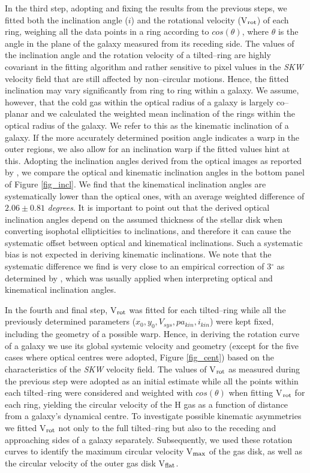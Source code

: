 \documentclass[usenatbib,useAMS]{mnras}
\begin{document}
In the third step, adopting and fixing the results from the previous
steps, we fitted both the inclination angle ($i$) and the rotational
velocity (V$_{\rm rot}$) of each ring, weighing all the data points in a
ring according to $cos(\theta)$, where $\theta$ is the angle in the
plane of the galaxy measured from its receding side.  The values of the
inclination angle and the rotation velocity of a tilted--ring are highly
covariant in the fitting algorithm and rather sensitive to pixel values
in the {\it SKW} velocity field that are still affected by non--circular
motions.  Hence, the fitted inclination may vary significantly from ring
to ring within a galaxy.  We assume, however, that the cold gas within
the optical radius of a galaxy is largely co--planar and we calculated
the weighted mean inclination of the rings within the optical radius of
the galaxy. We refer to this as the kinematic inclination of a
galaxy. If the more accurately determined position angle indicates a
warp in the outer regions, we also allow for an inclination warp if the
fitted values hint at this. Adopting the inclination angles derived from the optical
images as reported by , we compare the optical and
kinematic inclination angles in the bottom panel of Figure \ref{fig_incl}. 
We find that the kinematical inclination angles are
systematically lower than the optical ones, with an average weighted
difference of $2.06\pm0.81$ {\it degrees}.  It is important to point out
that the derived optical inclination angles depend on the assumed
thickness of the stellar disk when converting isophotal ellipticities to
inclinations, and therefore it can cause the systematic offset between
optical and kinematical inclinations.  Such a systematic bias is not
expected in deriving kinematic inclinations. We note that the
systematic difference we find is very close to an empirical correction
of 3$^{\circ}$ as determined by \citet{aar80}, which was usually applied
when interpreting optical and kinematical inclination angles.

In the fourth and final step, V$_{\rm rot}$ was fitted for each
tilted--ring while all the previously determined parameters ($x_{0},
y_{0}, V_{sys}, pa_{kin}, i_{kin}$) were kept fixed, including the
geometry of a possible warp. Hence, in deriving the rotation curve
of a galaxy we use its global systemic velocity and geometry (except for
the five cases where optical centres were adopted, Figure
\ref{fig_cent}) based on the characteristics of the {\it SKW} velocity
field. The values of V$_{\rm rot}$ as measured during the previous step
were adopted as an initial estimate while all the points within each
tilted--ring were considered and weighted with $cos(\theta)$ when
fitting V$_{\rm rot}$ for each ring, yielding the circular velocity of
the H{\sci} gas as a function of distance from a galaxy's dynamical
centre.  To investigate possible kinematic asymmetries we fitted V$_{\rm
rot}$ not only to the full tilted--ring but also to the receding and
approaching sides of a galaxy separately.  Subsequently, we used these
rotation curves to identify the maximum circular velocity V$_{\rm max}$
of the gas disk, as well as the circular velocity of the outer gas disk
V$_{\rm flat}$. 
\end{document}
